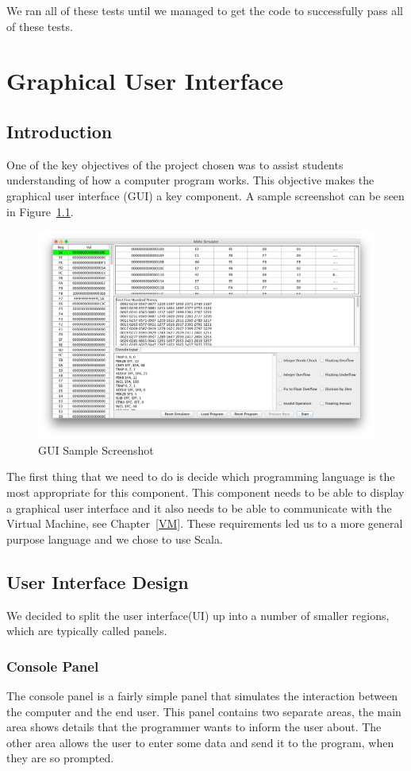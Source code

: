 \documentclass[a4paper,11pt]{report}
\begin{document}
We ran all of these tests until we managed to get the code to successfully pass all of these tests.

\chapter{Graphical User Interface}
\section{Introduction}
One of the key objectives of the project chosen was to assist students understanding of how a computer program works. This objective makes the graphical user interface (GUI) a key component. A sample screenshot can be seen in Figure~\ref{screenshot}.
\begin{figure}[ht!]
\centering
\includegraphics[width=\textwidth]{GUISample3}
\caption{GUI Sample Screenshot}
\label{screenshot}
\end{figure}

The first thing that we need to do is decide which programming language is the most appropriate for this component. This component needs to be able to display a graphical user interface and it also needs to be able to communicate with the Virtual Machine, see Chapter~\ref{VM}. These requirements led us to a more general purpose language and we chose to use Scala.
\section{User Interface Design}
We decided to split the user interface(UI) up into a number of smaller regions, which are typically called panels. 
\subsection{Console Panel}
The console panel is a fairly simple panel that simulates the interaction between the computer and the end user. This panel contains two separate areas, the main area shows details that the programmer wants to inform the user about. The other area allows the user to enter some data and send it to the program, when they are so prompted.
\end{document}
